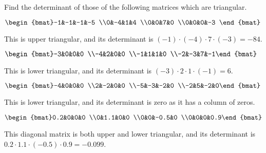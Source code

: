 \begin{example} 
Find the determinant of those of the following matrices which are triangular.
\begin{Parts}
\item \(\begin{bmat}-1&-1&-1&-5
\\0&-4&1&4
\\0&0&7&0
\\0&0&0&-3 \end{bmat}\)
\begin{solution} 
This is upper triangular, and its determinant is \((-1)\cdot(-4)\cdot7\cdot(-3)=-84\). 
\end{solution}

\item \(\begin{bmat}-3&0&0&0
\\-4&2&0&0
\\-1&1&1&0
\\-2&-3&7&-1\end{bmat}\)
\begin{solution} 
This is lower triangular, and its determinant is \((-3)\cdot2\cdot1\cdot(-1)=6\). 
\end{solution}

\begin{reduce}
\item \(\begin{bmat}-4&0&0&0
\\2&-2&0&0
\\-5&-3&-2&0
\\-2&5&-2&0\end{bmat}\)
\begin{solution} 
This is lower triangular, and its determinant is zero as it has a column of zeros. 
\end{solution}

\item \(\begin{bmat}0.2&0&0&0
\\0&1.1&0&0
\\0&0&-0.5&0
\\0&0&0&0.9\end{bmat}\)
\begin{solution} 
This diagonal matrix is both upper and lower triangular, and its determinant is \(0.2\cdot1.1\cdot(-0.5)\cdot0.9=-0.099\). 
\end{solution}
\end{reduce}


\end{Parts}
\end{example}
